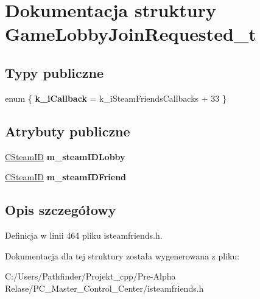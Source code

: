 \hypertarget{struct_game_lobby_join_requested__t}{}\section{Dokumentacja struktury Game\+Lobby\+Join\+Requested\+\_\+t}
\label{struct_game_lobby_join_requested__t}
\subsection*{Typy publiczne}
\begin{DoxyCompactItemize}
\item 
\mbox{\label{struct_game_lobby_join_requested__t_a4382cf2ca02ea4a3c2985374ae385746}} 
enum \{ {\bfseries k\+\_\+i\+Callback} = k\+\_\+i\+Steam\+Friends\+Callbacks + 33
 \}
\end{DoxyCompactItemize}
\subsection*{Atrybuty publiczne}
\begin{DoxyCompactItemize}
\item 
\mbox{\label{struct_game_lobby_join_requested__t_ac29bd3b647e9707fc3d65ff84c364fd0}} 
\hyperlink{class_c_steam_i_d}{C\+Steam\+ID} {\bfseries m\+\_\+steam\+I\+D\+Lobby}
\item 
\mbox{\label{struct_game_lobby_join_requested__t_a324ce97b80ea674c630cbd51cc35fe72}} 
\hyperlink{class_c_steam_i_d}{C\+Steam\+ID} {\bfseries m\+\_\+steam\+I\+D\+Friend}
\end{DoxyCompactItemize}


\subsection{Opis szczegółowy}


Definicja w linii 464 pliku isteamfriends.\+h.



Dokumentacja dla tej struktury została wygenerowana z pliku\+:\begin{DoxyCompactItemize}
\item 
C\+:/\+Users/\+Pathfinder/\+Projekt\+\_\+cpp/\+Pre-\/\+Alpha Relase/\+P\+C\+\_\+\+Master\+\_\+\+Control\+\_\+\+Center/isteamfriends.\+h\end{DoxyCompactItemize}
